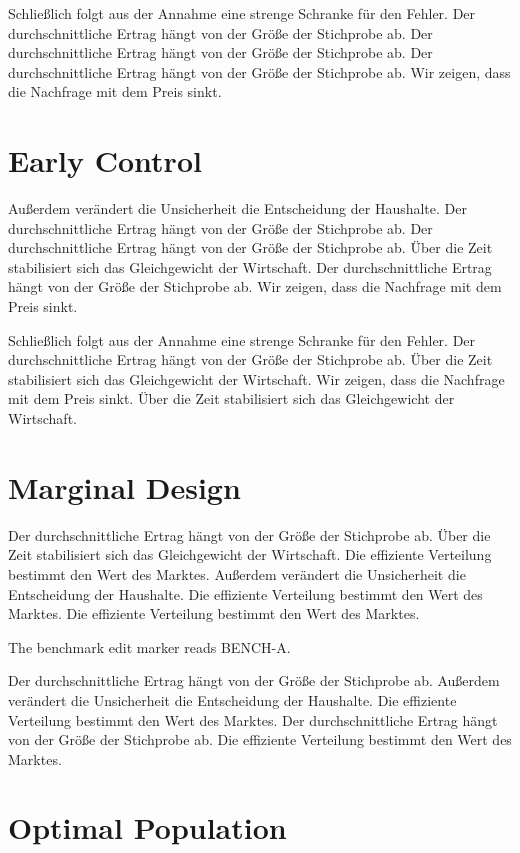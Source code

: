 \documentclass[11pt]{article}
\begin{document}
Schließlich folgt aus der Annahme eine strenge Schranke für den Fehler. Der durchschnittliche Ertrag hängt von der Größe der Stichprobe ab. Der durchschnittliche Ertrag hängt von der Größe der Stichprobe ab. Der durchschnittliche Ertrag hängt von der Größe der Stichprobe ab. Wir zeigen, dass die Nachfrage mit dem Preis sinkt.

\section{Early Control}\label{sec:19}

Außerdem verändert die Unsicherheit die Entscheidung der Haushalte. Der durchschnittliche Ertrag hängt von der Größe der Stichprobe ab. Der durchschnittliche Ertrag hängt von der Größe der Stichprobe ab. Über die Zeit stabilisiert sich das Gleichgewicht der Wirtschaft. Der durchschnittliche Ertrag hängt von der Größe der Stichprobe ab. Wir zeigen, dass die Nachfrage mit dem Preis sinkt.

Schließlich folgt aus der Annahme eine strenge Schranke für den Fehler. Der durchschnittliche Ertrag hängt von der Größe der Stichprobe ab. Über die Zeit stabilisiert sich das Gleichgewicht der Wirtschaft. Wir zeigen, dass die Nachfrage mit dem Preis sinkt. Über die Zeit stabilisiert sich das Gleichgewicht der Wirtschaft.

\section{Marginal Design}\label{sec:20}

Der durchschnittliche Ertrag hängt von der Größe der Stichprobe ab. Über die Zeit stabilisiert sich das Gleichgewicht der Wirtschaft. Die effiziente Verteilung bestimmt den Wert des Marktes. Außerdem verändert die Unsicherheit die Entscheidung der Haushalte. Die effiziente Verteilung bestimmt den Wert des Marktes. Die effiziente Verteilung bestimmt den Wert des Marktes.

The benchmark edit marker reads BENCH-A.

Der durchschnittliche Ertrag hängt von der Größe der Stichprobe ab. Außerdem verändert die Unsicherheit die Entscheidung der Haushalte. Die effiziente Verteilung bestimmt den Wert des Marktes. Der durchschnittliche Ertrag hängt von der Größe der Stichprobe ab. Die effiziente Verteilung bestimmt den Wert des Marktes.

\section{Optimal Population}\label{sec:21}
\end{document}
